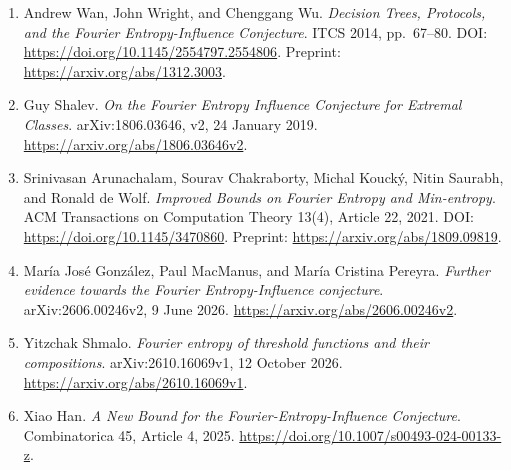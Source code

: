 \documentclass[
  american,
  11pt,
]{article}
\providecommand{\tightlist}{%
  \setlength{\itemsep}{0pt}\setlength{\parskip}{0pt}}
\begin{document}
\begin{enumerate}
\def\labelenumi{\arabic{enumi}.}
\tightlist
\item
  Andrew Wan, John Wright, and Chenggang Wu. \emph{Decision Trees,
  Protocols, and the Fourier Entropy-Influence Conjecture}. ITCS 2014,
  pp.~67--80. DOI: \url{https://doi.org/10.1145/2554797.2554806}.
  Preprint: \url{https://arxiv.org/abs/1312.3003}.
\item
  Guy Shalev. \emph{On the Fourier Entropy Influence Conjecture for
  Extremal Classes}. arXiv:1806.03646, v2, 24 January 2019.
  \url{https://arxiv.org/abs/1806.03646v2}.
\item
  Srinivasan Arunachalam, Sourav Chakraborty, Michal Koucký, Nitin
  Saurabh, and Ronald de Wolf. \emph{Improved Bounds on Fourier Entropy
  and Min-entropy}. ACM Transactions on Computation Theory 13(4),
  Article 22, 2021. DOI: \url{https://doi.org/10.1145/3470860}.
  Preprint: \url{https://arxiv.org/abs/1809.09819}.
\item
  María José González, Paul MacManus, and María Cristina Pereyra.
  \emph{Further evidence towards the Fourier Entropy-Influence
  conjecture}. arXiv:2606.00246v2, 9 June 2026.
  \url{https://arxiv.org/abs/2606.00246v2}.
\item
  Yitzchak Shmalo. \emph{Fourier entropy of threshold functions and
  their compositions}. arXiv:2610.16069v1, 12 October 2026.
  \url{https://arxiv.org/abs/2610.16069v1}.
\item
  Xiao Han. \emph{A New Bound for the Fourier-Entropy-Influence
  Conjecture}. Combinatorica 45, Article 4, 2025.
  \url{https://doi.org/10.1007/s00493-024-00133-z}.
\end{enumerate}
\end{document}
